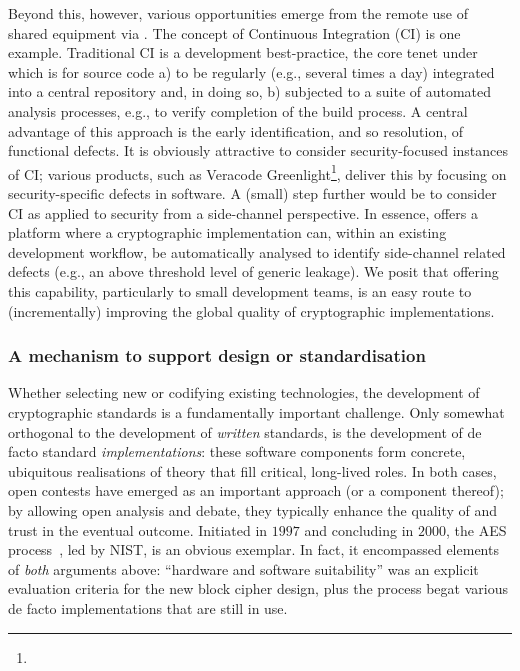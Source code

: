 Beyond this, however, various opportunities emerge from the remote use of
shared equipment via \LABID.  The concept of Continuous Integration (CI)
is one example.  Traditional CI is a development best-practice, the core 
tenet under which is for source code 
a) to be regularly (e.g., several times a day) integrated into a central repository 
   and, in doing so, 
b) subjected to a suite of automated analysis processes, e.g., to verify completion of the build process.
A central advantage of this approach is the early identification, and so
resolution, of functional defects.  
It is obviously attractive to consider security-focused instances of CI;
various products, such as Veracode Greenlight\footnote{
}, deliver this by focusing on security-specific defects in software.  A
(small) step further would be to consider CI as applied to security from
a side-channel perspective.  In essence, \LABID offers a platform where a 
cryptographic implementation can, within an existing development workflow,
be automatically analysed to identify side-channel related defects (e.g., 
an above threshold level of generic leakage).
We posit that offering this capability, particularly to small development
teams, is an easy route to (incrementally) improving the global quality 
of cryptographic implementations.


\subsubsection{A mechanism to support design or standardisation}

Whether selecting new or codifying existing technologies, the development
of cryptographic standards is a fundamentally important challenge.  Only 
somewhat orthogonal to the development of {\em written} standards, is the 
development of de facto standard {\em implementations}: these software 
components form concrete, ubiquitous realisations of theory that fill 
critical, long-lived roles.
In both cases, open contests have emerged as an important approach (or a
component thereof); by allowing open analysis and debate, they typically 
enhance the quality of and trust in the eventual outcome.  Initiated in
$1997$ and concluding in $2000$, the AES process~\cite{SCARV:Burr:03},
led by NIST, is an obvious exemplar.  In fact, it encompassed elements of 
{\em both} arguments above: ``hardware and software suitability'' was an 
explicit evaluation criteria for the new block cipher design, plus the 
process begat various de facto implementations that are still in use.


